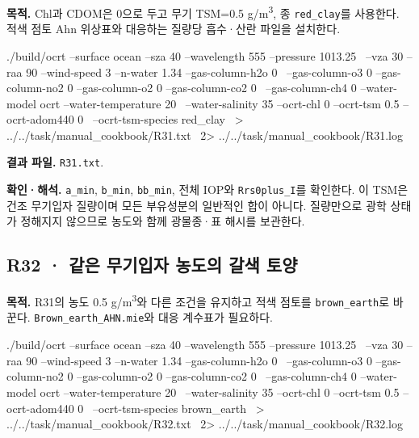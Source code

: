 \label{recipe:R31}

\textbf{목적. }Chl과 CDOM은 0으로 두고 무기 TSM=0.5 g/m\textsuperscript{3}, 종 \texttt{red\_\allowbreak{}clay}를 사용한다. 적색 점토 Ahn 위상표와 대응하는 질량당 흡수·산란 파일을 설치한다.

\noindent\begin{minipage}{\linewidth}
\begin{ManualCode}

./build/ocrt --surface ocean --sza 40 --wavelength 555 --pressure 1013.25 \
  --vza 30 --raa 90 --wind-speed 3 --n-water 1.34 --gas-column-h2o 0 \
  --gas-column-o3 0 --gas-column-no2 0 --gas-column-o2 0 --gas-column-co2 0 \
  --gas-column-ch4 0 --water-model ocrt --water-temperature 20 \
  --water-salinity 35 --ocrt-chl 0 --ocrt-tsm 0.5 --ocrt-adom440 0 \
  --ocrt-tsm-species red_clay \
  > ../../task/manual_cookbook/R31.txt \
  2> ../../task/manual_cookbook/R31.log

\end{ManualCode}
\end{minipage}\par

\textbf{결과 파일. }\texttt{R31.txt}.

\textbf{확인·해석. }\texttt{a\_\allowbreak{}min}, \texttt{b\_\allowbreak{}min}, \texttt{bb\_\allowbreak{}min}, 전체 IOP와 \texttt{Rrs0plus\_\allowbreak{}I}를 확인한다. 이 TSM은 건조 무기입자 질량이며 모든 부유성분의 일반적인 합이 아니다. 질량만으로 광학 상태가 정해지지 않으므로 농도와 함께 광물종·표 해시를 보관한다.


\subsection{R32 · 같은 무기입자 농도의 갈색 토양}
\label{sec:auto:09_cookbook:6.7}

\label{recipe:R32}

\textbf{목적. }R31의 농도 0.5 g/m\textsuperscript{3}와 다른 조건을 유지하고 적색 점토를 \texttt{brown\_\allowbreak{}earth}로 바꾼다. \texttt{Brown\_\allowbreak{}earth\_\allowbreak{}AHN.mie}와 대응 계수표가 필요하다.

\noindent\begin{minipage}{\linewidth}
\begin{ManualCode}

./build/ocrt --surface ocean --sza 40 --wavelength 555 --pressure 1013.25 \
  --vza 30 --raa 90 --wind-speed 3 --n-water 1.34 --gas-column-h2o 0 \
  --gas-column-o3 0 --gas-column-no2 0 --gas-column-o2 0 --gas-column-co2 0 \
  --gas-column-ch4 0 --water-model ocrt --water-temperature 20 \
  --water-salinity 35 --ocrt-chl 0 --ocrt-tsm 0.5 --ocrt-adom440 0 \
  --ocrt-tsm-species brown_earth \
  > ../../task/manual_cookbook/R32.txt \
  2> ../../task/manual_cookbook/R32.log

\end{ManualCode}
\end{minipage}\par


